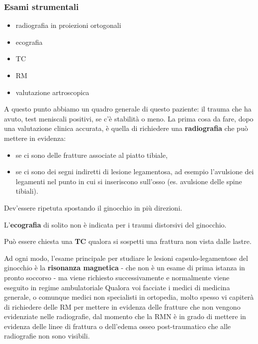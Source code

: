 \subsubsection{Esami strumentali}

\begin{itemize}
\item
  radiografia in proiezioni ortogonali
\item
  ecografia
\item
  TC
\item
  RM
\item
  valutazione artroscopica
\end{itemize}

A questo punto abbiamo un quadro generale di questo paziente: il trauma che ha avuto, test meniscali positivi, se c'è stabilità o meno.
La prima cosa da fare, dopo una valutazione clinica accurata, è quella di richiedere una \textbf{radiografia} che può mettere in evidenza:

\begin{itemize}
\item
  se ci sono delle fratture associate al piatto tibiale,
\item
  se ci sono dei segni indiretti di lesione legamentosa, ad esempio l'avulsione dei legamenti nel punto in cui si inseriscono sull'osso (es. avulsione delle spine tibiali).
\end{itemize}
Dev'essere ripetuta spostando il ginocchio in più direzioni.

L'\textbf{ecografia} di solito non è indicata per i traumi distorsivi del ginocchio.

Può essere chiesta una \textbf{TC} qualora si sospetti una frattura non vista dalle lastre.

Ad ogni modo, l'esame principale per studiare le lesioni
capsulo-legamentose del ginocchio è la \textbf{risonanza magnetica} - che non è un esame di prima istanza in pronto soccorso - ma viene richiesto successivamente e normalmente viene eseguito in regime ambulatoriale Qualora voi facciate i medici di medicina generale, o comunque medici non specialisti in ortopedia, molto spesso vi capiterà di richiedere delle RM per mettere in evidenza delle fratture che non vengono evidenziate nelle radiografie, dal momento che la RMN è in grado di mettere in evidenza delle linee di frattura o dell'edema osseo post-traumatico che alle radiografie non sono visibili.

